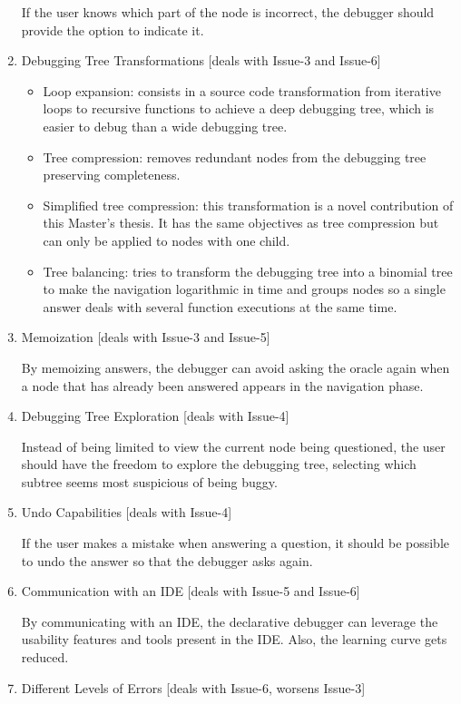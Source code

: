 \begin{enumerate}
If the user knows which part of the node is incorrect, the debugger should provide the option to indicate it.
\item Debugging Tree Transformations [deals with Issue-3 and Issue-6]

\begin{itemize}
    \item Loop expansion: consists in a source code transformation from iterative loops to recursive functions to achieve a deep debugging tree, which is easier to debug than a wide debugging tree.
    \item Tree compression: removes redundant nodes from the debugging tree preserving completeness.
    \item Simplified tree compression: this transformation is a novel contribution of this Master's thesis. It has the same objectives as tree compression but can only be applied to nodes with one child.
    \item Tree balancing: tries to transform the debugging tree into a binomial tree to make the navigation logarithmic in time and groups nodes so a single answer deals with several function executions at the same time.
\end{itemize}

    \item Memoization [deals with Issue-3 and Issue-5]

By memoizing answers, the debugger can avoid asking the oracle again when a node that has already been answered appears in the navigation phase.
\item Debugging Tree Exploration [deals with Issue-4]

Instead of being limited to view the current node being questioned, the user should have the freedom to explore the debugging tree, selecting which subtree seems most suspicious of being buggy.
\item Undo Capabilities [deals with Issue-4]

If the user makes a mistake when answering a question, it should be possible to undo the answer so that the debugger asks again.
\item Communication with an IDE [deals with Issue-5 and Issue-6]

By communicating with an IDE, the declarative debugger can leverage the usability features and tools present in the IDE. Also, the learning curve gets reduced.
\item Different Levels of Errors [deals with Issue-6, worsens Issue-3]


\end{enumerate}
